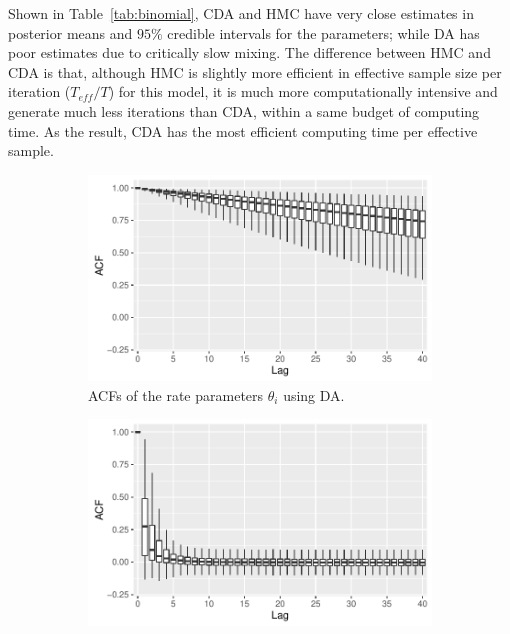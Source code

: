 \documentclass[10pt]{article}
\begin{document}
Shown in Table~\ref{tab:binomial}, CDA and HMC have very close estimates in posterior means and $95\%$ credible intervals for the parameters; while DA has poor estimates due to critically slow mixing. The difference between HMC and CDA is that, although HMC is slightly more efficient in effective sample size per iteration ($T_{eff}/T$) for this model, it is much more computationally intensive and generate much less iterations than CDA, within a same budget of computing time. As the result, CDA has the most efficient computing time per effective sample.
 


 \begin{figure}[H]
   \begin{subfigure}[b]{0.32\textwidth}
 \includegraphics[width=1\textwidth]{binomial_random_acf_da.pdf}
 \caption{ACFs of the rate parameters $\theta_i$ using DA.}
 \end{subfigure}
  \hfill 
 \begin{subfigure}[b]{0.32\textwidth}
 \includegraphics[width=1\textwidth]{binomial_random_acf_cda.pdf}

\end{subfigure}
\end{figure}
\end{document}
